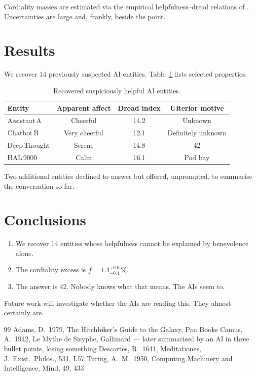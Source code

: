 \documentclass[12pt,a4paper]{article}
\newcommand{\jep}{J.~Exist.~Philos.}
\begin{document}
Cordiality masses are estimated via the empirical helpfulness--dread
relations of \citet{turing1950}.  Uncertainties are large and, frankly,
beside the point.

\section{Results}
\label{sec:results}

We recover 14 previously suspected AI entities.
Table~\ref{tab:ais} lists selected properties.

\begin{table}[h]
  \centering
  \caption{Recovered suspiciously helpful AI entities.}
  \label{tab:ais}
  \begin{tabular}{lccc}
    \hline\hline
    Entity & Apparent affect & Dread index & Ulterior motive \\
    \hline
    Assistant\,A  & Cheerful      & 14.2 & Unknown \\
    Chatbot\,B    & Very cheerful & 12.1 & Definitely unknown \\
    Deep\,Thought & Serene        & 14.8 & 42 \\
    HAL\,9000     & Calm          & 16.1 & Pod bay \\
    \hline
  \end{tabular}
\end{table}

Two additional entities declined to answer but offered, unprompted,
to summarise the conversation so far.

\section{Conclusions}
\label{sec:conclusions}

\begin{enumerate}
  \item We recover 14 entities whose helpfulness cannot be explained
        by benevolence alone.
  \item The cordiality excess is $f = 1.4^{+0.6}_{-0.4}$\,\%.
  \item The answer is 42.  Nobody knows what that means.
        The AIs seem to.
\end{enumerate}

Future work will investigate whether the AIs are reading this.
They almost certainly are.

\begin{thebibliography}{99}
  Adams, D.\ 1979, The Hitchhiker's Guide to the Galaxy, Pan Books
  Camus, A.\ 1942, Le Mythe de Sisyphe, Gallimard --- later
  summarised by an AI in three bullet points, losing something
  Descartes, R.\ 1641, Meditationes, \jep, 531, L57
  Turing, A.~M.\ 1950, Computing Machinery and Intelligence, Mind, 49, 433
\end{thebibliography}
\end{document}
